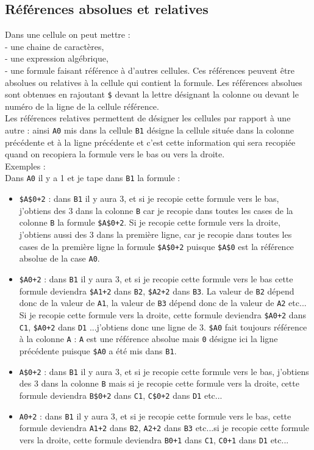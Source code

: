 \documentclass[a4paper,11pt]{book}
\begin{document}
\subsection{R\'ef\'erences absolues et relatives}\label{sec:references}
Dans une cellule on peut mettre :\\
- une chaine de caract\`eres,\\
- une expression alg\'ebrique,\\
- une formule faisant r\'ef\'erence \`a d'autres cellules. Ces r\'ef\'erences
peuvent \^etre absolues ou relatives \`a la cellule qui contient la formule. 
Les r\'ef\'erences absolues sont obtenues en rajoutant {\tt \$} devant la 
lettre d\'esignant la colonne ou devant le num\'ero de la ligne de la cellule 
r\'ef\'erence.\\
Les r\'ef\'erences relatives permettent de d\'esigner les cellules par 
rapport \`a une autre : ainsi  {\tt A0} mis dans la cellule {\tt B1} d\'esigne 
la cellule situ\'ee dans la colonne pr\'ec\'edente et \`a la ligne 
pr\'ec\'edente et c'est cette information qui sera recopi\'ee quand on
 recopiera la formule vers le bas ou vers la droite.\\
Exemples :\\
Dans {\tt A0} il y a 1 et je tape dans {\tt B1} la formule :
\begin{itemize}
\item {\tt \$A\$0+2} : dans {\tt B1} il y aura 3, et si je recopie cette 
formule vers le bas, j'obtiens  des 3 dans la colonne {\tt B} car je recopie 
dans toutes les cases de la colonne {\tt B} la formule {\tt \$A\$0+2}. Si je 
recopie cette formule vers la droite, j'obtiens  aussi des 3 dans la 
premi\`ere ligne, car je recopie dans toutes les cases de la premi\`ere ligne 
la formule {\tt \$A\$0+2} puisque {\tt \$A\$0} est la r\'ef\'erence absolue 
de la case {\tt A0}.
\item {\tt \$A0+2} : dans {\tt B1} il y aura 3, et si je recopie cette formule 
vers le bas cette formule deviendra {\tt \$A1+2} dans {\tt B2}, {\tt \$A2+2} 
dans {\tt B3}. La valeur de {\tt B2} d\'epend donc de la valeur de {\tt A1}, 
la valeur de {\tt B3} d\'epend donc de la valeur de {\tt A2} etc...\\ 
Si je recopie cette formule vers la droite, cette formule deviendra 
{\tt \$A0+2} dans {\tt C1}, {\tt \$A0+2} dans {\tt D1} ...j'obtiens  
donc une ligne de 3. {\tt \$A0} fait toujours r\'ef\'erence \`a la colonne 
{\tt A} : {\tt A} est une r\'ef\'erence absolue mais {\tt 0} d\'esigne ici la 
ligne pr\'ec\'edente puisque {\tt \$A0} a \'et\'e mis dans {\tt B1}. 
\item  {\tt A\$0+2} : dans {\tt B1} il y aura 3, et si je recopie cette formule
vers le bas, j'obtiens des 3 dans la colonne {\tt B} mais si je recopie cette 
formule vers la droite, cette formule deviendra {\tt B\$0+2} dans {\tt C1}, 
{\tt C\$0+2} dans {\tt D1} etc... 
\item {\tt A0+2} : dans {\tt B1} il y aura 3, et si je recopie cette formule 
vers le bas, cette formule deviendra {\tt A1+2} dans {\tt B2}, {\tt A2+2} dans 
{\tt B3} etc...si je recopie cette formule vers la droite, cette formule 
deviendra {\tt B0+1} dans {\tt C1}, {\tt C0+1} dans {\tt D1} etc... 
\end{itemize}
\end{document}

